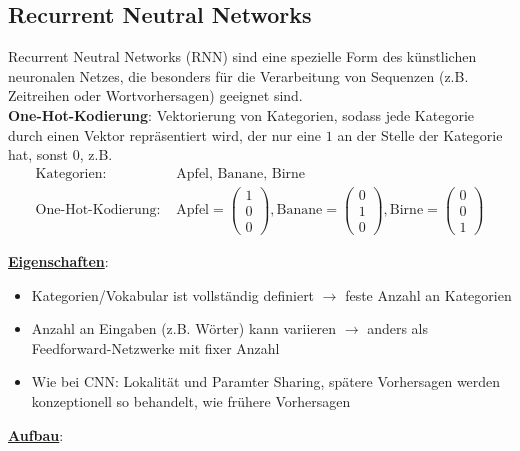 \subsection{Recurrent Neutral Networks}
\label{RNN}
Recurrent Neutral Networks (RNN) sind eine spezielle Form des künstlichen neuronalen Netzes, die besonders für die Verarbeitung von Sequenzen (z.B. Zeitreihen oder Wortvorhersagen) geeignet sind.\\

\textbf{One-Hot-Kodierung}: Vektorierung von Kategorien, sodass jede Kategorie durch einen Vektor repräsentiert wird, der nur eine $1$ an der Stelle der Kategorie hat, sonst $0$, z.B.
\begin{equation*}
    \begin{aligned}
        \text{Kategorien: } &\text{Apfel, Banane, Birne}\\
        \text{One-Hot-Kodierung: } &\text{Apfel} = \begin{pmatrix}
            1\\
            0\\
            0
        \end{pmatrix}, \text{Banane} = \begin{pmatrix}
            0\\
            1\\
            0
        \end{pmatrix}, \text{Birne} = \begin{pmatrix}
            0\\
            0\\
            1
        \end{pmatrix}
    \end{aligned}
\end{equation*}

\underline{\textbf{Eigenschaften}}:
\begin{itemize}
    \item Kategorien/Vokabular ist vollständig definiert $\rightarrow$ feste Anzahl an Kategorien
    \item Anzahl an Eingaben (z.B. Wörter) kann variieren $\rightarrow$ anders als Feedforward-Netzwerke mit fixer Anzahl
    \item Wie bei CNN: Lokalität und Paramter Sharing, spätere Vorhersagen werden konzeptionell so behandelt, wie frühere Vorhersagen\\
\end{itemize}

\underline{\textbf{Aufbau}}:

